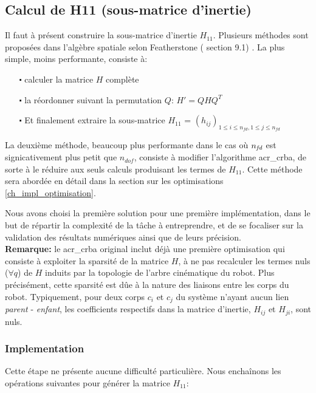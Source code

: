 \documentclass{report}
\begin{document}
\subsection{Calcul de H11 (sous-matrice d'inertie)}

Il faut à présent construire la sous-matrice d'inertie $H_{11}$. Plusieurs méthodes sont proposées dans l'algèbre spatiale selon Featherstone (\cite{bib_featherstone} section 9.1) . La plus simple, moins performante, consiste à:
\begin{itemize}
\item[$\centerdot$] calculer la matrice $H$ complète
\item[$\centerdot$] la réordonner suivant la permutation $Q$: $H'=Q H Q^T$
\item[$\centerdot$] Et finalement extraire la sous-matrice $H_{11}$ = $(h_{ij})_{1 \leqslant i \leqslant n_{fd},1 \leqslant j \leqslant n_{fd}}$
\end{itemize}
\bigskip
La deuxième méthode, beaucoup plus performante dans le cas où $n_{\emph{fd}}$ est signicativement plus petit que $n_{dof}$, consiste à modifier l'algorithme \gls{acr_crba}, de sorte à le réduire aux seuls calculs produisant les termes de $H_{11}$. Cette méthode sera abordée en détail dans la section sur les optimisations \ref{ch_impl_optimisation}.

Nous avons choisi la première solution pour une première implémentation, dans le but de répartir la complexité de la tâche à entreprendre, et de se focaliser sur la validation des résultats numériques ainsi que de leurs précision.\\
\textbf{Remarque:} le \gls{acr_crba} original inclut déjà une première optimisation qui consiste à exploiter la sparsité de la matrice $H$, \cad à ne pas recalculer les termes nuls ($\forall q$) de $H$ induits par la topologie de l'arbre cinématique du robot. Plus précisément, cette sparsité est dûe à la nature des liaisons entre les corps du robot. Typiquement, pour deux corps $c_i$ et $c_j$ du système n'ayant aucun lien \emph{parent} - \emph{enfant}, les coefficients respectifs dans la matrice d'inertie, $H_{ij}$ et $H_{ji}$, sont nuls.

\subsubsection{Implementation}

Cette étape ne présente aucune difficulté particulière. Nous enchaînons les opérations suivantes pour générer la matrice $H_{11}$:
\end{document}
